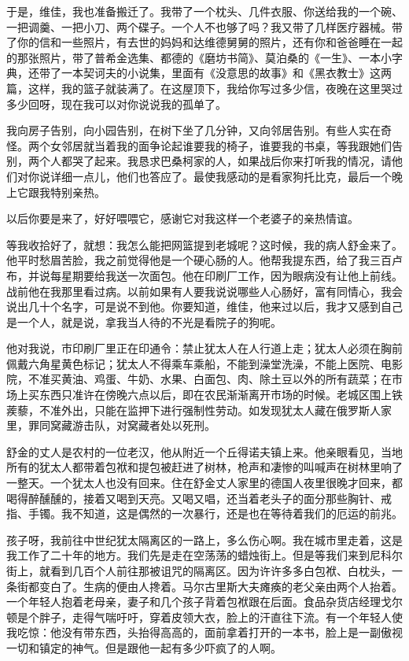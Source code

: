 于是，维佳，我也准备搬迁了。我带了一个枕头、几件衣服、你送给我的一个碗、一把调羹、一把小刀、两个碟子。一个人不也够了吗？我又带了几样医疗器械。带了你的信和一些照片，有去世的妈妈和达维德舅舅的照片，还有你和爸爸睡在一起的那张照片，带了普希金选集、都德的《磨坊书简》、莫泊桑的《一生》、一本小字典，还带了一本契诃夫的小说集，里面有《没意思的故事》和《黑衣教士》这两篇，这样，我的篮子就装满了。在这屋顶下，我给你写过多少信，夜晚在这里哭过多少回呀，现在我可以对你说说我的孤单了。

我向房子告别，向小园告别，在树下坐了几分钟，又向邻居告别。有些人实在奇怪。两个女邻居就当着我的面争论起谁要我的椅子，谁要我的书桌，等我跟她们告别，两个人都哭了起来。我恳求巴桑柯家的人，如果战后你来打听我的情况，请他们对你说详细一点儿，他们也答应了。最使我感动的是看家狗托比克，最后一个晚上它跟我特别亲热。

以后你要是来了，好好喂喂它，感谢它对我这样一个老婆子的亲热情谊。

等我收拾好了，就想：我怎么能把网篮提到老城呢？这时候，我的病人舒金来了。他平时愁眉苦脸，我之前觉得他是一个硬心肠的人。他帮我提东西，给了我三百卢布，并说每星期要给我送一次面包。他在印刷厂工作，因为眼病没有让他上前线。战前他在我那里看过病。以前如果有人要我说说哪些人心肠好，富有同情心，我会说出几十个名字，可是说不到他。你要知道，维佳，他来过以后，我才又感到自己是一个人，就是说，拿我当人待的不光是看院子的狗呢。

他对我说，市印刷厂里正在印通令：禁止犹太人在人行道上走；犹太人必须在胸前佩戴六角星黄色标记；犹太人不得乘车乘船，不能到澡堂洗澡，不能上医院、电影院，不准买黄油、鸡蛋、牛奶、水果、白面包、肉、除土豆以外的所有蔬菜；在市场上买东西只准许在傍晚六点以后，即在农民渐渐离开市场的时候。老城区围上铁蒺藜，不准外出，只能在监押下进行强制性劳动。如发现犹太人藏在俄罗斯人家里，罪同窝藏游击队，对窝藏者处以死刑。

舒金的丈人是农村的一位老汉，他从附近一个丘得诺夫镇上来。他亲眼看见，当地所有的犹太人都带着包袱和提包被赶进了树林，枪声和凄惨的叫喊声在树林里响了一整天。一个犹太人也没有回来。住在舒金丈人家里的德国人夜里很晚才回来，都喝得醉醺醺的，接着又喝到天亮。又喝又唱，还当着老头子的面分那些胸针、戒指、手镯。我不知道，这是偶然的一次暴行，还是也在等待着我们的厄运的前兆。

孩子呀，我前往中世纪犹太隔离区的一路上，多么伤心啊。我在城市里走着，这是我工作了二十年的地方。我们先是走在空荡荡的蜡烛街上。但是等我们来到尼科尔街上，就看到几百个人前往那被诅咒的隔离区。因为许许多多白包袱、白枕头，一条街都变白了。生病的便由人搀着。马尔古里斯大夫瘫痪的老父亲由两个人抬着。一个年轻人抱着老母亲，妻子和几个孩子背着包袱跟在后面。食品杂货店经理戈尔顿是个胖子，走得气喘吁吁，穿着皮领大衣，脸上的汗直往下流。有一个年轻人使我吃惊：他没有带东西，头抬得高高的，面前拿着打开的一本书，脸上是一副傲视一切和镇定的神气。但是跟他一起有多少吓疯了的人啊。

